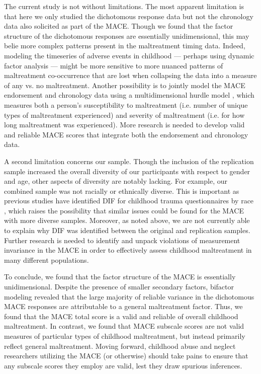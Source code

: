\documentclass[letterpaper,man,natbib,floatsintext,longtable]{apa6}
\begin{document}
The current study is not without limitations. The most apparent limitation is that here we only studied the dichotomous response data but not the chronology data also solicited as part of the MACE. Though we found that the factor structure of the dichotomous responses are essentially unidimensional, this may belie more complex patterns present in the maltreatment timing data. Indeed, modeling the timeseries of adverse events in childhood --- perhaps using dynamic factor analysis \citep{zhang2007bayesian} --- might be more sensitive to more nuanced patterns of maltreatment co-occurrence that are lost when collapsing the data into a measure of any vs. no maltreatment. Another possibility is to jointly model the MACE endorsement and chronology data using a multidimensional hurdle model \citep{magnus2021symptom}, which measures both a person's susceptibility to maltreatment (i.e. number of unique types of maltreatment experienced) and severity of maltreatment (i.e. for how long maltreatment was experienced). More research is needed to develop valid and reliable MACE scores that integrate both the endorsement and chronology data. 

A second limitation concerns our sample. Though the inclusion of the replication sample increased the overall diversity of our participants with respect to gender and age, other aspects of diversity are notably lacking. For example, our combined sample was not racially or ethnically diverse. This is important as previous studies have identified DIF for childhood trauma questionnaires by race \citep{thombs2007evaluation, rodriguez2019identification}, which raises the possibility that similar issues could be found for the MACE with more diverse samples. Moreover, as noted above, we are not currently able to explain why DIF was identified between the original and replication samples. Further research is needed to identify and unpack violations of measurement invariance in the MACE in order to effectively assess childhood maltreatment in many different populations. 

To conclude, we found that the factor structure of the MACE is essentially unidimensional. Despite the presence of smaller secondary factors, bifactor modeling revealed that the large majority of reliable variance in the dichotomous MACE responses are attributable to a general maltreatment factor. Thus, we found that the MACE total score is a valid and reliable of overall childhood maltreatment. In contrast, we found that MACE subscale scores are not valid measures of particular types of childhood maltreatment, but instead primarily reflect general maltreatment. Moving forward, childhood abuse and neglect researchers utilizing the MACE (or otherwise) should take pains to ensure that any subscale scores they employ are valid, lest they draw spurious inferences. 
\end{document}
